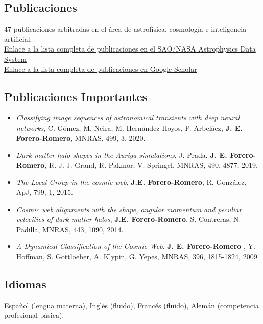 \documentclass[a4paper,10pt]{article} %
\begin{document}
\newpage

\color{red}
\subsection{Publicaciones}
\color{black}

47 publicaciones arbitradas en el \'area de astrof\'isica, cosmolog\'ia e inteligencia artificial.\\
\href{https://ui.adsabs.harvard.edu/search/filter_property_fq_property=AND&filter_property_fq_property=property%3A%22refereed%22&fq=%7B!type%3Daqp%20v%3D%24fq_property%7D&fq_property=(property%3A%22refereed%22)&q=%20author%3A%22forero-romero%22&sort=date%20desc%2C%20bibcode%20desc&p_=0} {Enlace a la lista completa de publicaciones en el SAO/NASA Astrophysics Data System}\\
\href{https://scholar.google.com/citations?user=TLTK6WgAAAAJ&hl=en}{Enlace a la lista completa de publicaciones en Google Scholar}

\color{black}



\color{red}
\subsection{Publicaciones Importantes}
\color{black}
\begin{itemize}


 \item {\it Classifying image sequences of astronomical transients
   with deep neural networks}, 
   C. G\'omez, M. Neira,  M. Hernández Hoyos, P. Arbeláez,
   {\bf J. E. Forero-Romero}, MNRAS, 499, 3, 2020.
   
\item {\it Dark matter halo shapes in the Auriga simulations}, 
  J. Prada, {\bf J. E. Forero-Romero}, R. J. J. Grand, R. Pakmor, 
  V. Springel,  MNRAS, 490, 4877, 2019.

\item{\it The Local Group in the cosmic web}, {\bf
  J.E. Forero-Romero}, R. Gonz\'alez, ApJ, 799, 1, 2015.

\item{\it Cosmic web alignments with the shape, angular momentum
  and peculiar velocities of dark matter halos}, 
  {\bf J.E. Forero-Romero}, S. Contreras, N. Padilla, MNRAS, 443,
  1090, 2014. 

\item  {\it A Dynamical Classification of the  Cosmic Web}.  {\bf
  J. E. Forero-Romero} , Y. Hoffman,  S. Gottloeber, A. Klypin, G. Yepes, 
MNRAS, 396, 1815-1824, 2009   

\end{itemize}


\color{red}
\subsection{Idiomas}
\color{black}


Español (lengua materna), Inglés (fluido), Francés (fluido), Alemán (competencia profesional básica).
 
\end{document}
